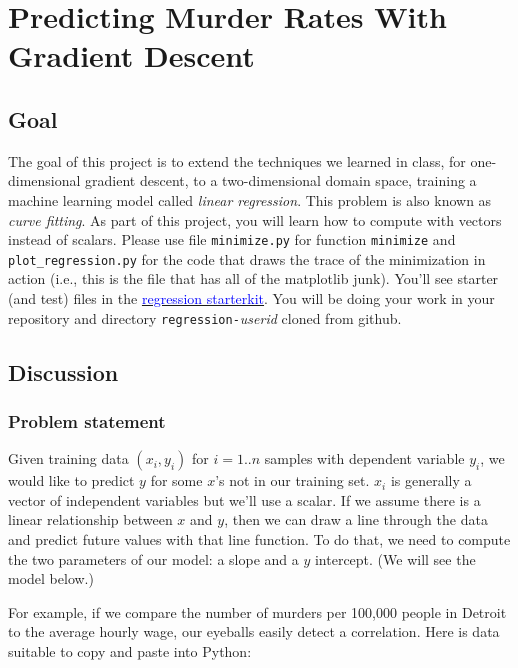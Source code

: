 \documentclass[titlepage]{tufte-book}
\newcounter{problem}
\begin{document}
\chapter{Predicting Murder Rates With Gradient Descent}

\section{Goal}

\begin{fullwidth}

The goal of this project is to extend the techniques we learned in class, for one-dimensional gradient descent, to a two-dimensional domain space, training a machine learning model called {\em linear regression}.  This problem is also known as {\em curve fitting}.  As part of this project, you will learn how to compute with vectors instead of scalars. Please use file {\tt minimize.py} for function {\tt minimize} and {\tt plot\_regression.py} for the code that draws the trace of the minimization in action (i.e., this is the file that has all of the matplotlib junk).  You'll see starter (and test) files in the \href{https://github.com/parrt/msan501-starterkit/tree/master/regression}{\textcolor{blue}{regression starterkit}}. You will be doing your work in your repository and directory {\tt regression-}{\em userid}{\tt } cloned from github.

\section{Discussion}

\subsection{Problem statement}

Given training data $(x_i, y_i)$ for $i=1..n$ samples with dependent variable $y_i$, we would like to predict $y$ for some $x$'s not in our training set. $x_i$ is generally a vector of independent variables but we'll use a scalar. If we assume there is a linear relationship between $x$ and $y$, then we can draw a line through the data and predict future values with that line function. To do that, we need to compute the two parameters of our model: a slope and a $y$ intercept. (We will see the model below.)

For example, if we compare the number of murders per 100,000 people in Detroit to the average hourly wage, our eyeballs easily detect a correlation.  Here is data suitable to copy and paste into Python:


\end{fullwidth}
\end{document}
